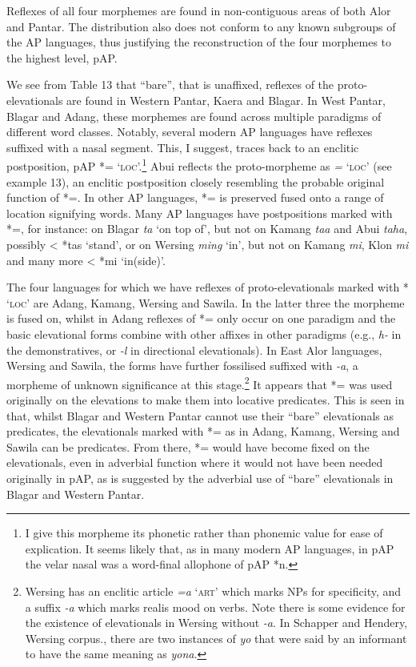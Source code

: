 Reflexes of all four morphemes are found in non-contiguous areas of both Alor and Pantar. The distribution also does not conform to any known subgroups of the AP languages, thus justifying the reconstruction of the four morphemes to the highest level, pAP.

 We see from Table 13 that ``bare'', that is unaffixed, reflexes of the proto-elevationals are found in Western Pantar, Kaera and Blagar. In West Pantar, Blagar and  Adang, these morphemes are found across multiple paradigms of different word classes. Notably, several modern AP languages have reflexes suffixed with a nasal segment. This, I suggest, traces back to an enclitic postposition, pAP *={\ng} `\textsc{loc}'.\footnote{{}  I give this morpheme its phonetic rather than phonemic value for ease of explication. It seems likely that, as in many modern AP languages, in pAP the velar nasal was a word-final allophone of pAP *n.}  Abui reflects the proto-morpheme as \textit{=}\textit{{\ng}} `\textsc{loc}' (see example 13), an enclitic postposition closely resembling the probable original function of *={\ng}. In other AP languages, *={\ng} is preserved fused onto a range of location signifying words. Many AP languages have postpositions marked with *={\ng}, for instance: on Blagar \textit{ta}\textit{{\ng}} `on top of', but not on Kamang \textit{taa} and Abui \textit{taha}, possibly {\textless} *tas `stand', or on Wersing \textit{ming} `in', but not on Kamang \textit{mi}, Klon \textit{mi} and many more {\textless} *mi `in(side)'. 

The four languages for which we have reflexes of proto-elevationals marked with *{\ng} `\textsc{loc}' are Adang, Kamang, Wersing and Sawila. In the latter three the morpheme is fused on, whilst in Adang reflexes of *={\ng} only occur on one paradigm and the basic elevational forms combine with other affixes in other paradigms (e.g., \textit{h}\textit{{\textepsilon}}\textit{{}-} in the demonstratives, or \textit{{}-l}\textit{{\textepsilon}} in directional elevationals). In East Alor languages, Wersing and Sawila, the forms have further fossilised suffixed with \textit{{}-a}, a morpheme of unknown significance at this stage.\footnote{{}  Wersing has an enclitic article \textit{=a} `\textsc{art}' which marks NPs for specificity, and a suffix \textit{{}-a} which marks realis mood on verbs. Note there is some evidence for the existence of elevationals in Wersing without \textit{{}-a}. In Schapper and Hendery, Wersing corpus., there are two instances of \textit{yo{\ng}} that were said by an informant to have the same meaning as \textit{yona}.} It appears that *={\ng} was used originally on the elevations to make them into locative predicates. This is seen in that, whilst Blagar and Western Pantar cannot use their ``bare'' elevationals as predicates, the elevationals marked with *={\ng} as in Adang, Kamang, Wersing and Sawila can be predicates. From there, *={\ng} would have become fixed on the elevationals, even in adverbial function where it would not have been needed originally in pAP, as is suggested by the adverbial use of ``bare'' elevationals in Blagar and Western Pantar.

